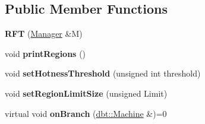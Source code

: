 \subsection*{Public Member Functions}
\begin{DoxyCompactItemize}
\item 
{\bfseries R\+FT} (\hyperlink{classdbt_1_1_manager}{Manager} \&M)\hypertarget{classdbt_1_1_r_f_t_a08e8344fcf006e7686b9a7fbea7379f6}{}\label{classdbt_1_1_r_f_t_a08e8344fcf006e7686b9a7fbea7379f6}

\item 
void {\bfseries print\+Regions} ()\hypertarget{classdbt_1_1_r_f_t_a7720a6ce7c8ffb857c1b7f33c0a89572}{}\label{classdbt_1_1_r_f_t_a7720a6ce7c8ffb857c1b7f33c0a89572}

\item 
void {\bfseries set\+Hotness\+Threshold} (unsigned int threshold)\hypertarget{classdbt_1_1_r_f_t_ac43200cf626524d6ca5697cd8f6d794e}{}\label{classdbt_1_1_r_f_t_ac43200cf626524d6ca5697cd8f6d794e}

\item 
void {\bfseries set\+Region\+Limit\+Size} (unsigned Limit)\hypertarget{classdbt_1_1_r_f_t_a4b0cd26491d435a4952761271f5fce6d}{}\label{classdbt_1_1_r_f_t_a4b0cd26491d435a4952761271f5fce6d}

\item 
virtual void {\bfseries on\+Branch} (\hyperlink{classdbt_1_1_machine}{dbt\+::\+Machine} \&)=0\hypertarget{classdbt_1_1_r_f_t_a10f61ba84db60a1da5ee5cc74804585f}{}\label{classdbt_1_1_r_f_t_a10f61ba84db60a1da5ee5cc74804585f}

\end{DoxyCompactItemize}

